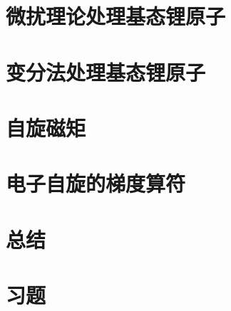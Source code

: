 \section{微扰理论处理基态锂原子}
\label{sec:10.7 Perturbation Treatment of the Lithium Ground State}

\section{变分法处理基态锂原子}
\label{sec:10.8 Variation Treatments of the Lithium Ground State}

\section{自旋磁矩}
\label{sec:10.9 Spin Magnetic Moment}

\section{电子自旋的梯度算符}
\label{sec:10.10 Ladder Operators for Electron Spin}

\section*{总结}

\section*{习题}